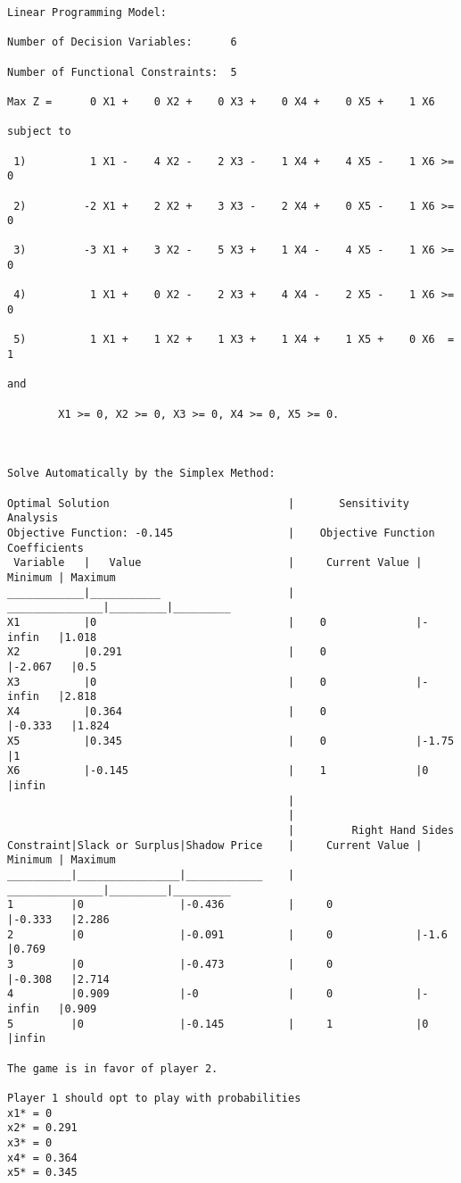 \documentclass[titlepage, letterpaper]{article}
\begin{document}
\begin{lstlisting}[basicstyle=\tiny]



Linear Programming Model:

Number of Decision Variables:      6

Number of Functional Constraints:  5

Max Z =      0 X1 +    0 X2 +    0 X3 +    0 X4 +    0 X5 +    1 X6 

subject to

 1)          1 X1 -    4 X2 -    2 X3 -    1 X4 +    4 X5 -    1 X6 >=       0

 2)         -2 X1 +    2 X2 +    3 X3 -    2 X4 +    0 X5 -    1 X6 >=       0

 3)         -3 X1 +    3 X2 -    5 X3 +    1 X4 -    4 X5 -    1 X6 >=       0

 4)          1 X1 +    0 X2 -    2 X3 +    4 X4 -    2 X5 -    1 X6 >=       0

 5)          1 X1 +    1 X2 +    1 X3 +    1 X4 +    1 X5 +    0 X6  =       1

and

        X1 >= 0, X2 >= 0, X3 >= 0, X4 >= 0, X5 >= 0.



Solve Automatically by the Simplex Method:

Optimal Solution                            |       Sensitivity Analysis
Objective Function: -0.145                  |    Objective Function Coefficients
 Variable   |   Value                       |     Current Value | Minimum | Maximum 
____________|___________                    |    _______________|_________|_________
X1          |0                              |    0              |-infin   |1.018
X2          |0.291                          |    0              |-2.067   |0.5
X3          |0                              |    0              |-infin   |2.818
X4          |0.364                          |    0              |-0.333   |1.824
X5          |0.345                          |    0              |-1.75    |1
X6          |-0.145                         |    1              |0        |infin
                                            |
                                            |
                                            |         Right Hand Sides
Constraint|Slack or Surplus|Shadow Price    |     Current Value | Minimum | Maximum 
__________|________________|____________    |    _______________|_________|_________
1         |0               |-0.436          |     0             |-0.333   |2.286
2         |0               |-0.091          |     0             |-1.6     |0.769
3         |0               |-0.473          |     0             |-0.308   |2.714
4         |0.909           |-0              |     0             |-infin   |0.909
5         |0               |-0.145          |     1             |0        |infin

The game is in favor of player 2.

Player 1 should opt to play with probabilities
x1* = 0
x2* = 0.291
x3* = 0
x4* = 0.364
x5* = 0.345
\end{lstlisting}
\end{document}

